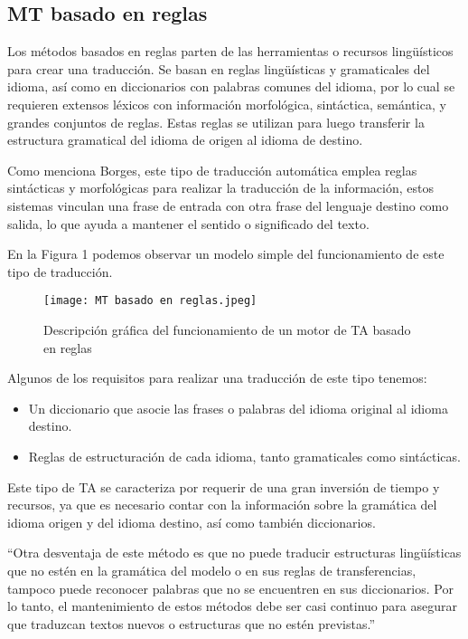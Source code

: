 \documentclass[conference]{IEEEtran}
\begin{document}
\subsection{MT basado en reglas}

Los métodos basados en reglas parten de las herramientas o recursos lingüísticos para crear una traducción. Se basan en reglas lingüísticas y gramaticales del idioma, así como en diccionarios con palabras comunes del idioma, por lo cual se requieren extensos léxicos con información morfológica, sintáctica, semántica, y grandes conjuntos de reglas.
Estas reglas se utilizan para luego transferir la estructura gramatical del idioma de origen al idioma de destino.\cite{b2}

Como menciona Borges, este tipo de traducción automática emplea reglas sintácticas y morfológicas para realizar la traducción de la información, estos sistemas vinculan una frase de entrada con otra frase del lenguaje destino como salida, lo que ayuda a mantener el sentido o significado del texto.

En la Figura 1 podemos observar un modelo simple del funcionamiento de este tipo de traducción.

\begin{figure}[htp]
        \centering
        \texttt{[image: MT basado en reglas.jpeg]}
        \label{foto}
        \caption{Descripción gráfica del funcionamiento de un motor de TA basado en reglas}
    \end{figure}
\vspace{3cm}

Algunos de los requisitos para realizar una traducción de este tipo tenemos:
\begin{itemize}
    \item Un diccionario que asocie las frases o palabras del idioma original al idioma destino.
    \item Reglas de estructuración de cada idioma, tanto gramaticales como sintácticas.
\end{itemize}

Este tipo de TA se caracteriza por requerir de una gran inversión de tiempo y recursos, ya que es necesario contar con la información sobre la gramática del idioma origen y del idioma destino, así como también diccionarios.

“Otra desventaja de este método es que no puede traducir estructuras lingüísticas que no estén en la gramática del modelo o en sus reglas de transferencias, tampoco puede reconocer palabras que no se encuentren en sus diccionarios. Por lo tanto, el mantenimiento de estos métodos debe ser casi continuo para asegurar que traduzcan textos nuevos o estructuras que no estén previstas.”\cite{b2}
\end{document}
